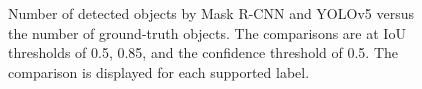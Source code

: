 \begin{figure}[!ht]
    \centering
    \quad
    \caption{Number of detected objects by Mask R-CNN and YOLOv5 versus the number of ground-truth objects. The comparisons are at IoU thresholds of 0.5, 0.85, and the confidence threshold of 0.5. The comparison is displayed for each supported label.} 
    \label{fig:model_missed_detection}
\end{figure}